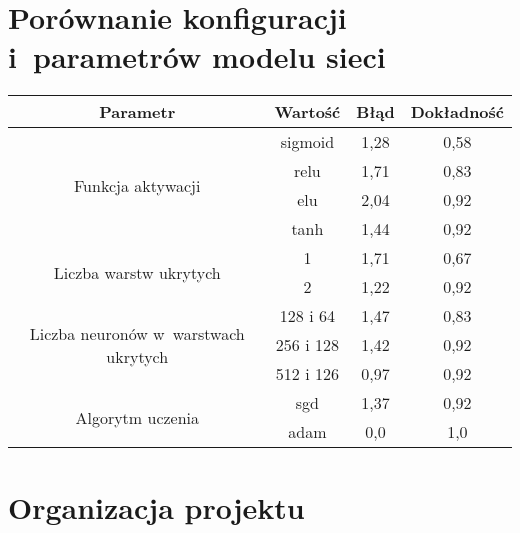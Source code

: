 \chapter{Porównanie konfiguracji i~parametrów modelu sieci}
\label{ch:nn_comparison_table}

\begin{table}[!h]
\centering
\begin{tabular}{c|c|c|c}
\toprule
Parametr                                              & Wartość   & Błąd & Dokładność \\
\midrule
\multirow{4}{*}{Funkcja aktywacji}                    & sigmoid   & 1,28 & 0,58       \\
                                                      & relu      & 1,71 & 0,83       \\
                                                      & elu       & 2,04 & 0,92       \\
                                                      & tanh      & 1,44 & 0,92       \\
\midrule
\multirow{2}{*}{Liczba warstw ukrytych}               & 1         & 1,71 & 0,67       \\
                                                      & 2         & 1,22 & 0,92       \\
\midrule                                                     
\multirow{3}{*}{\parbox{5cm}
{\centering Liczba neuronów w~warstwach ukrytych}}     & 128 i 64  & 1,47 & 0,83       \\
                                                      & 256 i 128 & 1,42 & 0,92       \\
                                                      & 512 i 126 & 0,97 & 0,92       \\
\midrule
\multirow{2}{*}{Algorytm uczenia}                     & sgd       & 1,37 & 0,92       \\
                                                      & adam      & 0,0  & 1,0        \\
\bottomrule
\end{tabular}
\end{table}

\chapter{Organizacja projektu}
